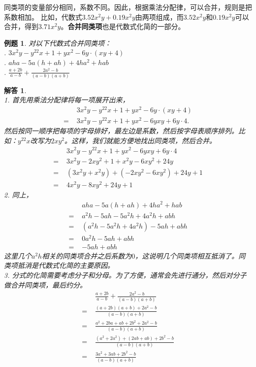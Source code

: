 \documentclass[12pt,UTF8]{ctexbook}
\newtheorem{et}{例题}[section]
\newtheorem*{so}{解答}
\begin{document}
同类项的变量部分相同，系数不同。因此，根据乘法分配律，可以合并，规则是把系数相加。
比如，代数式$3.52x^2y + 0.19x^2y$由两项组成，而$3.52x^2y$和$0.19x^2y$可以合并，得到$3.71x^2y$。\textbf{合并同类项}也是代数式化简的一部分。
\begin{et}
    对以下代数式合并同类项：\\
    . $3x^2y - y^22x + 1 + yx^2 - 6y\cdot (xy + 4)$ \\
    . $aha - 5a(h + ah) + 4ha^2 + hab$ \\
    . $\frac{a + 2b}{a - b} + \frac{2a^2 - b}{(a - b)(a + b)}$ 
\end{et}
\begin{so}
    \mbox{}\\
    1. 首先用乘法分配律将每一项展开出来，
    \begin{align*}
             & 3x^2y - y^22x + 1 + yx^2 - 6y\cdot (xy + 4)  \\
        =\,\,& 3x^2y - y^22x + 1 + yx^2 - 6yxy + 6y\cdot 4. 
    \end{align*}
    然后按同一顺序把每项的字母排好，最左边是系数，然后按字母表顺序排列。比如：$y^22x$改写为$2xy^2$。这样，我们就能方便地找出同类项，然后合并。
    \begin{align*}
             &3x^2y - y^22x + 1 + yx^2 - 6yxy + 6y\cdot 4  \\
        =\,\,&3x^2y - 2xy^2 + 1 + x^2y - 6xy^2 + 24y  \\
        =\,\,&(3x^2y + x^2y) + (- 2xy^2 - 6xy^2) + 24y + 1  \\
        =\,\,&4x^2y - 8xy^2 + 24 y + 1 
    \end{align*}
    2. 同上，
    \begin{align*}
             & aha - 5a(h + ah) + 4ha^2 + hab  \\
        =\,\,& a^2h - 5ah - 5a^2h + 4a^2h + abh  \\
        =\,\,& (a^2h  - 5a^2h + 4a^2h) - 5ah + abh  \\
        =\,\,& 0a^2h - 5ah + abh  \\
        =\,\,& - 5ah + abh  
    \end{align*}
    这里几个$a^2h$相关的同类项合并之后系数为$0$，这说明几个同类项相互抵消了。同类项抵消是代数式化简的主要原因。\\
    3. 分式的化简需要考虑分子和分母。为了方便，通常会先进行通分，然后对分子做合并同类项，最后约分。
    \begin{align*}
             & \frac{a + 2b}{a - b} + \frac{2a^2 - b}{(a - b)(a + b)}  \\
        =\,\,& \frac{(a + 2b)(a + b) + 2a^2 - b}{(a - b)(a + b)}  \\
        =\,\,& \frac{a^2 + 2ba + ab + 2b^2 + 2a^2 - b}{(a - b)(a + b)}  \\
        =\,\,& \frac{(a^2 + 2a^2) + (2ab + ab) + 2b^2 - b}{(a - b)(a + b)}  \\
        =\,\,& \frac{3a^2 + 3ab + 2b^2 - b}{(a - b)(a + b)}  
    \end{align*}
\end{so}
\end{document}
